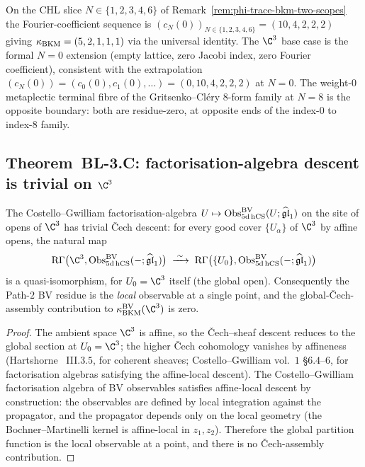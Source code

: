 \begin{remark}[Residue formula at $N = 0$]
\label{rem:bl-bv-n-zero-residue}
On the CHL slice $N\in\{1,2,3,4,6\}$ of Remark~\ref{rem:phi-trace-bkm-two-scopes}
the Fourier-coefficient sequence is $(c_N(0))_{N\in\{1,2,3,4,6\}}
= (10, 4, 2, 2, 2)$ giving $\kappa_{\mathrm{BKM}} = (5, 2, 1, 1, 1)$ via the universal
identity. The $\C^3$ base case is the formal $N = 0$ extension
(empty lattice, zero Jacobi index, zero Fourier coefficient),
consistent with the extrapolation
$(c_N(0)) = (c_0(0), c_1(0), \ldots) = (0, 10, 4, 2, 2, 2)$ at
$N = 0$.
The weight-$0$ metaplectic terminal fibre of the Gritsenko--Cléry
$8$-form family at $N = 8$ is the opposite boundary: both are
residue-zero, at opposite ends of the index-$0$ to index-$8$ family.
\end{remark}

\subsection*{Theorem~BL-3.C: factorisation-algebra descent is trivial on $\C^3$}

\begin{theorem}
\label{thm:bl-bv-c3-cech}
\ClaimStatusProvedHere
The Costello--Gwilliam factorisation-algebra
$U \mapsto \mathrm{Obs}^{\mathrm{BV}}_{5\mathrm{d\,hCS}}(U;\widehat{\mathfrak{gl}}_1)$ on the
site of opens of $\C^3$ has trivial \v{C}ech descent: for every good
cover $\{U_\alpha\}$ of $\C^3$ by affine opens, the natural map
\[
  \mathrm{R}\Gamma\bigl(\C^3, \Obs^\BV_{5\mathrm{d\,hCS}}(-;\ghat)\bigr)
  \;\xrightarrow{\;\sim\;}\;
  \mathrm{R}\Gamma\bigl(\{U_0\}, \Obs^\BV_{5\mathrm{d\,hCS}}(-;\ghat)\bigr)
\]
is a quasi-isomorphism, for $U_0 = \C^3$ itself (the global
open). Consequently the Path-$2$ BV residue is the \emph{local}
observable at a single point, and the global-\v{C}ech-assembly
contribution to $\kBKM^{\mathrm{BV}}(\C^3)$ is zero.
\end{theorem}

\begin{proof}
The ambient space $\C^3$ is affine, so the \v{C}ech--sheaf descent
reduces to the global section at $U_0 = \C^3$; the higher \v{C}ech
cohomology vanishes by affineness (Hartshorne~\cite{Hartshorne}
III.$3$.$5$, for coherent sheaves; Costello--Gwilliam vol.\ $1$
\S$6$.$4$--$6$, for factorisation algebras satisfying the
affine-local descent). The Costello--Gwilliam factorisation algebra
of BV observables satisfies affine-local descent by construction:
the observables are defined by local integration against the
propagator, and the propagator depends only on the local geometry
(the Bochner--Martinelli kernel is affine-local in $z_1, z_2$).
Therefore the global partition function is the local observable at
a point, and there is no \v{C}ech-assembly contribution.
\end{proof}

